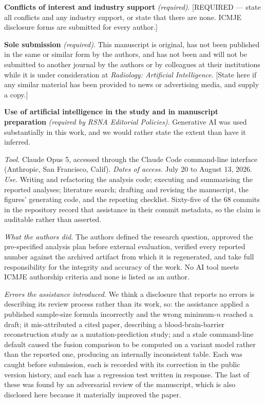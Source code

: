 \documentclass[11pt]{article}
\begin{document}
\textbf{Conflicts of interest and industry support} \textit{(required)}.
[REQUIRED --- state all conflicts and any industry support, or state that there
are none. ICMJE disclosure forms are submitted for every author.]

\textbf{Sole submission} \textit{(required)}. This manuscript is original, has not
been published in the same or similar form by the authors, and has not been and
will not be submitted to another journal by the authors or by colleagues at their
institutions while it is under consideration at \textit{Radiology: Artificial
Intelligence}. [State here if any similar material has been provided to news or
advertising media, and supply a copy.]

\textbf{Use of artificial intelligence in the study and in manuscript
preparation} \textit{(required by RSNA Editorial Policies)}. Generative AI was
used substantially in this work, and we would rather state the extent than have it
inferred.

\textit{Tool.} Claude Opus 5, accessed through the Claude Code command-line
interface (Anthropic, San Francisco, Calif). \textit{Dates of access.} July 20 to
August 13, 2026. \textit{Use.} Writing and refactoring the analysis code;
executing and summarising the reported analyses; literature search; drafting and
revising the manuscript, the figures' generating code, and the reporting
checklist. Sixty-five of the 68 commits in the repository record that assistance
in their commit metadata, so the claim is auditable rather than asserted.

\textit{What the authors did.} The authors defined the research question,
approved the pre-specified analysis plan before external evaluation, verified
every reported number against the archived artifact from which it is regenerated,
and take full responsibility for the integrity and accuracy of the work. No AI
tool meets ICMJE authorship criteria and none is listed as an author.

\textit{Errors the assistance introduced.} We think a disclosure that reports no
errors is describing its review process rather than its work, so: the assistance
applied a published sample-size formula incorrectly and the wrong minimum-$n$
reached a draft; it mis-attributed a cited paper, describing a
blood-brain-barrier reconstruction study as a mutation-prediction study; and a
stale command-line default caused the fusion comparison to be computed on a
variant model rather than the reported one, producing an internally inconsistent
table. Each was caught before submission, each is recorded with its correction in
the public version history, and each has a regression test written in response.
The last of these was found by an adversarial review of the manuscript, which is
also disclosed here because it materially improved the paper.
\end{document}
